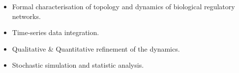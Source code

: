 \begin{frame}[c]
{\begin{block}
  \begin{itemize}
   \item Formal characterisation of topology and dynamics of biological regulatory networks.
   \item Time-series data integration.
   \item Qualitative \& Quantitative refinement of the dynamics.
   \item Stochastic simulation and statistic analysis.
  \end{itemize}

 \end{block}
}

\end{frame}
                   

